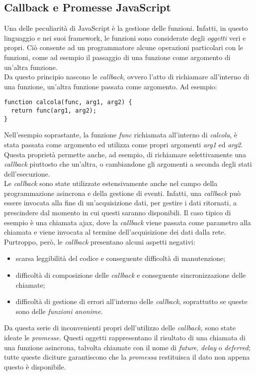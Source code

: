 \subsection{Callback e Promesse JavaScript}
Una delle peculiarità di JavaScript è la gestione delle funzioni. Infatti, in questo linguaggio e nei suoi framework, le funzioni sono considerate degli \emph{oggetti} veri e propri. Ciò consente ad un programmatore alcune operazioni particolari con le funzioni, come ad esempio il passaggio di una funzione come argomento di un'altra funzione.\\
Da questo principio nascono le \emph{callback}, ovvero l'atto di richiamare all'interno di una funzione, un'altra funzione passata come argomento. Ad esempio:
\begin{verbatim}
function calcola(func, arg1, arg2) {
  return func(arg1, arg2);
}
\end{verbatim}
Nell'esempio soprastante, la funzione \emph{func} richiamata all'interno di \emph{calcola}, è stata passata come argomento ed utilizza come propri argomenti \emph{arg1} ed \emph{arg2}. Questa proprietà permette anche, ad esempio, di richiamare selettivamente una \emph{callback} piuttosto che un'altra, o cambiandone gli argomenti a seconda degli stati dell'esecuzione.\\
Le \emph{callback} sono state utilizzate estensivamente anche nel campo della programmazione asincrona e della gestione di eventi. Infatti, una \emph{callback} può essere invocata alla fine di un'acquisizione dati, per gestire i dati ritornati, a prescindere dal momento in cui questi saranno disponibili. Il caso tipico di esempio è una chiamata \gls{ajax}\glsfirstoccur, dove la \emph{callback} viene passata come parametro alla chiamata e viene invocata al termine dell'acquisizione dei dati dalla rete.\\
Purtroppo, però, le \emph{callback} presentano alcuni aspetti negativi:
\begin{itemize}
	\item scarsa leggibilità del codice e conseguente difficoltà di manutenzione;
	\item difficoltà di composizione delle \emph{callback} e conseguente sincronizzazione delle chiamate;
	\item difficoltà di gestione di errori all'interno delle \emph{callback}, soprattutto se queste sono delle \emph{funzioni anonime}.
\end{itemize}
Da questa serie di inconvenienti propri dell'utilizzo delle \emph{callback}, sono state ideate le \emph{promesse}. Questi oggetti rappresentano il risultato di una chiamata di una funzione asincrona, talvolta chiamate con il nome di \emph{future}, \emph{delay} o \emph{deferred}; tutte queste diciture garantiscono che la \emph{promessa} restituisca il dato non appena questo è disponibile.\\
